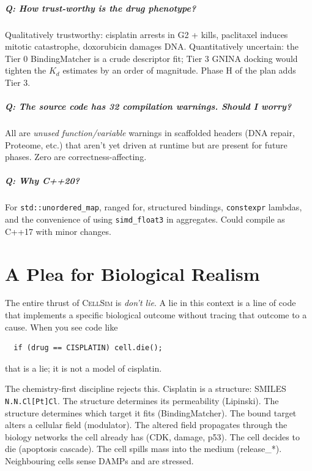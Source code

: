 \documentclass[11pt,letterpaper,twoside,openany]{book}
\newcommand{\code}[1]{\texttt{#1}}
\begin{document}
\paragraph{Q: How trust-worthy is the drug phenotype?}

Qualitatively trustworthy: cisplatin arrests in G2 + kills,
paclitaxel induces mitotic catastrophe, doxorubicin damages DNA.
Quantitatively uncertain: the Tier 0 BindingMatcher is a crude
descriptor fit; Tier 3 GNINA docking would tighten the $K_d$
estimates by an order of magnitude. Phase H of the plan adds
Tier 3.

\paragraph{Q: The source code has 32 compilation warnings. Should
I worry?}

All are \emph{unused function/variable} warnings in scaffolded
headers (DNA repair, Proteome, etc.) that aren't yet driven at
runtime but are present for future phases. Zero are
correctness-affecting.

\paragraph{Q: Why C++20?}

For \code{std::unordered\_map}, ranged for, structured bindings,
\code{constexpr} lambdas, and the convenience of using
\code{simd\_float3} in aggregates. Could compile as C++17 with
minor changes.

\chapter{A Plea for Biological Realism}
\label{ch:realism}

The entire thrust of \textsc{CellSim} is \emph{don't lie}. A lie
in this context is a line of code that implements a specific
biological outcome without tracing that outcome to a cause. When
you see code like
\begin{verbatim}
  if (drug == CISPLATIN) cell.die();
\end{verbatim}
that is a lie; it is not a model of cisplatin.

The chemistry-first discipline rejects this. Cisplatin is a
structure: SMILES \texttt{N.N.Cl[Pt]Cl}. The structure determines
its permeability (Lipinski). The structure determines which target
it fits (BindingMatcher). The bound target alters a cellular field
(modulator). The altered field propagates through the biology
networks the cell already has (CDK, damage, p53). The cell decides
to die (apoptosis cascade). The cell spills mass into the medium
(release\_*). Neighbouring cells sense DAMPs and are stressed.
\end{document}
